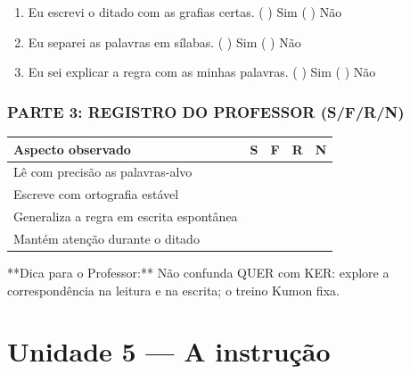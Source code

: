 \begin{exercicio}
\begin{enumerate}[label=\alph*)]
  \item Eu escrevi o ditado com as grafias certas.  \quad ( ) Sim   ( ) Não

  \item Eu separei as palavras em sílabas.  \quad ( ) Sim   ( ) Não

  \item Eu sei explicar a regra com as minhas palavras.  \quad ( ) Sim   ( ) Não

\end{enumerate}

\subsection*{PARTE 3: REGISTRO DO PROFESSOR (S/F/R/N)}

\begin{center}
\renewcommand{\arraystretch}{1.4}
\begin{tabular}{@{}p{9cm}cccc@{}}
\toprule
Aspecto observado & S & F & R & N \\
\midrule
Lê com precisão as palavras-alvo & & & & \\
Escreve com ortografia estável & & & & \\
Generaliza a regra em escrita espontânea & & & & \\
Mantém atenção durante o ditado & & & & \\
\bottomrule\end{tabular}\end{center}

\end{exercicio}

\begin{dica}
**Dica para o Professor:** Não confunda QUER com KER: explore a correspondência na leitura e na escrita; o treino Kumon fixa.
\end{dica}


\chapter{Unidade 5 --- A instrução}


